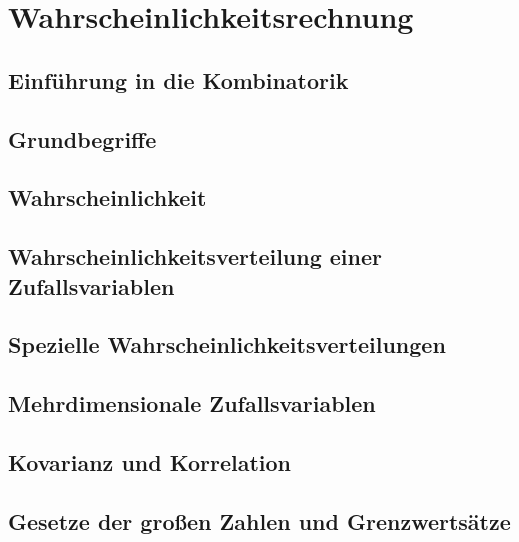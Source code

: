 \section{Wahrscheinlichkeitsrechnung}

\subsection{Einführung in die Kombinatorik}

\subsection{Grundbegriffe}

\subsection{Wahrscheinlichkeit}

\subsection{Wahrscheinlichkeitsverteilung einer Zufallsvariablen}

\subsection{Spezielle Wahrscheinlichkeitsverteilungen}

\subsection{Mehrdimensionale Zufallsvariablen}

\subsection{Kovarianz und Korrelation}

\subsection{Gesetze der großen Zahlen und Grenzwertsätze}
